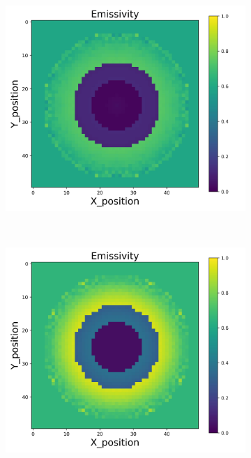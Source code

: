 \begin{figure}[p]
\begin{minipage}{\textwidth}
\begin{subfigure}{0.325\textwidth}
        \end{subfigure}
        \begin{subfigure}{0.325\textwidth}
            \centering
            \includegraphics[width=\textwidth]{figures/raw_data/21/linear/emi_cal.jpg}
        \end{subfigure}
    \end{minipage}\\
    \begin{minipage}{\textwidth}
        \centering
        \begin{subfigure}{0.325\textwidth}
            \centering
            \includegraphics[width=\textwidth]{figures/raw_data/22/linear/emi_cal.jpg}

\end{subfigure}
\end{minipage}
\end{figure}
